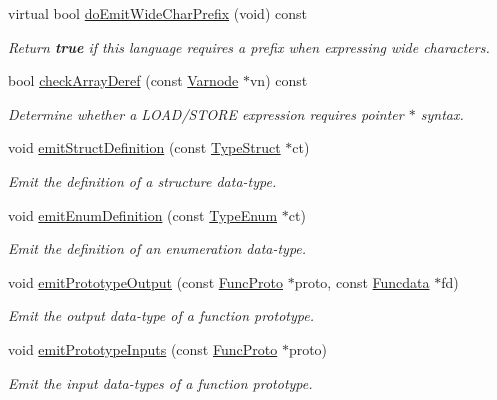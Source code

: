 \begin{DoxyCompactItemize}
virtual bool \mbox{\hyperlink{class_print_c_a3ccbcccc1706e4d29930ac2fdeadc19a}{do\+Emit\+Wide\+Char\+Prefix}} (void) const
\begin{DoxyCompactList}\small\item\em Return {\bfseries{true}} if this language requires a prefix when expressing {\itshape wide} characters. \end{DoxyCompactList}\item 
bool \mbox{\hyperlink{class_print_c_adb5d1d809d390a69943576628118b83b}{check\+Array\+Deref}} (const \mbox{\hyperlink{class_varnode}{Varnode}} $\ast$vn) const
\begin{DoxyCompactList}\small\item\em Determine whether a L\+O\+A\+D/\+S\+T\+O\+RE expression requires pointer \textquotesingle{}$\ast$\textquotesingle{} syntax. \end{DoxyCompactList}\item 
void \mbox{\hyperlink{class_print_c_a680ec03cb56eb70c13c4d1ee261cdda9}{emit\+Struct\+Definition}} (const \mbox{\hyperlink{class_type_struct}{Type\+Struct}} $\ast$ct)
\begin{DoxyCompactList}\small\item\em Emit the definition of a {\itshape structure} data-\/type. \end{DoxyCompactList}\item 
void \mbox{\hyperlink{class_print_c_acbe0fabc1fd91b959cfb892fc4149df7}{emit\+Enum\+Definition}} (const \mbox{\hyperlink{class_type_enum}{Type\+Enum}} $\ast$ct)
\begin{DoxyCompactList}\small\item\em Emit the definition of an {\itshape enumeration} data-\/type. \end{DoxyCompactList}\item 
void \mbox{\hyperlink{class_print_c_a037bdd9a25c0bb21308609afde6452d3}{emit\+Prototype\+Output}} (const \mbox{\hyperlink{class_func_proto}{Func\+Proto}} $\ast$proto, const \mbox{\hyperlink{class_funcdata}{Funcdata}} $\ast$fd)
\begin{DoxyCompactList}\small\item\em Emit the output data-\/type of a function prototype. \end{DoxyCompactList}\item 
void \mbox{\hyperlink{class_print_c_a316a42f523295a421f9d40f0b3fcf92e}{emit\+Prototype\+Inputs}} (const \mbox{\hyperlink{class_func_proto}{Func\+Proto}} $\ast$proto)
\begin{DoxyCompactList}\small\item\em Emit the input data-\/types of a function prototype. \end{DoxyCompactList}\item 

\end{DoxyCompactItemize}
